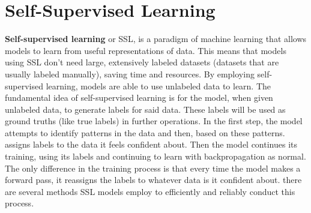 \section{Self-Supervised Learning}
\begin{flushleft}
    \large \textbf{Self-supervised learning} or SSL, is a paradigm of machine learning that allows models to learn from useful representations of data. This means that models using SSL don't need large, extensively labeled datasets (datasets that are usually labeled manually), saving time and resources. By employing self-supervised learning, models are able to use unlabeled data to learn. The fundamental idea of self-supervised learning is for the model, when given unlabeled data, to generate labels for said data. These labels will be used as ground truths (like true labels) in further operations. In the first step, the model attempts to identify patterns in the data and then, based on these patterns. assigns labels to the data it feels confident about. Then the model continues its training, using its labels and continuing to learn with backpropagation as normal. The only difference in the training process is that every time the model makes a forward pass, it reassigns the labels to whatever data is it confident about. there are several methods SSL models employ to efficiently and reliably conduct this process.
\end{flushleft}
